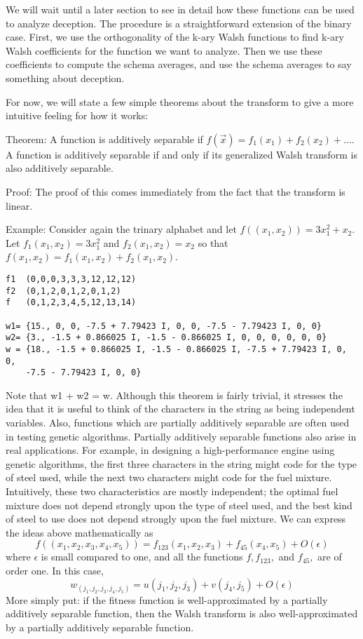 We will wait until a later section to see in detail how these functions can be
used to analyze deception.  The procedure is a straightforward extension of
the binary case.  First, we use the orthogonality of the k-ary Walsh
functions to find k-ary Walsh coefficients for the function we want to analyze.
Then we use these coefficients to compute the schema averages, and use
the schema averages to say something about deception.

For now, we will state a few simple theorems about the transform to give a
more intuitive feeling for how it works:


Theorem:
A function is additively separable if $f(\vec{x})=f_1(x_1)+f_2(x_2)+\ldots$.
A function is additively separable if and only if its generalized
Walsh transform is also additively separable.

Proof:
The proof of this comes immediately from the fact that the transform is
linear.

Example:
Consider again the trinary alphabet and let $f((x_1,x_2))=3 x_1^2 + x_2$.
Let $f_1(x_1,x_2)=3 x_1^2$ and $f_2(x_1,x_2)=x_2$ so that 
$f(x_1,x_2)=f_1(x_1,x_2)+f_2(x_1,x_2)$.

\begin{verbatim}
f1  (0,0,0,3,3,3,12,12,12)
f2  (0,1,2,0,1,2,0,1,2)
f   (0,1,2,3,4,5,12,13,14)

w1= {15., 0, 0, -7.5 + 7.79423 I, 0, 0, -7.5 - 7.79423 I, 0, 0}
w2= {3., -1.5 + 0.866025 I, -1.5 - 0.866025 I, 0, 0, 0, 0, 0, 0}
w = {18., -1.5 + 0.866025 I, -1.5 - 0.866025 I, -7.5 + 7.79423 I, 0, 0, 
	-7.5 - 7.79423 I, 0, 0}
\end{verbatim}

Note that w1 + w2 = w.  Although this theorem is fairly trivial, it
stresses the idea that it is useful to think of the characters in the string
as being independent variables.  Also, functions which are partially
additively separable are often used in testing genetic algorithms.
Partially additively separable functions also arise in real applications.
For example, in designing a high-performance engine using genetic algorithms,
the first three characters in the string might code for the type of steel
used, while the next two characters might code for the fuel mixture.
Intuitively, these two characteristics are mostly independent; the
optimal fuel mixture does not depend strongly upon the type of steel used,
and the best kind of steel to use does not depend strongly upon the fuel
mixture.  We can express the ideas above mathematically as
\begin{equation}
f((x_1,x_2,x_3,x_4,x_5))=f_{123}(x_1,x_2,x_3) + f_{45}(x_4,x_5) +
	O(\epsilon)
\end{equation}
where $\epsilon$ is small compared to one, and all the functions 
$f, f_{123},$ and $f_{45},$ are of order one.  In this case,
\begin{equation}
w_{(j_1,j_2,j_3,j_4,j_5)}=u(j_1,j_2,j_3)+v(j_4,j_5) + O(\epsilon)
\end{equation}
More simply put: if the fitness function is well-approximated by a
partially additively separable function, then the Walsh transform is
also well-approximated by a partially additively separable function.


